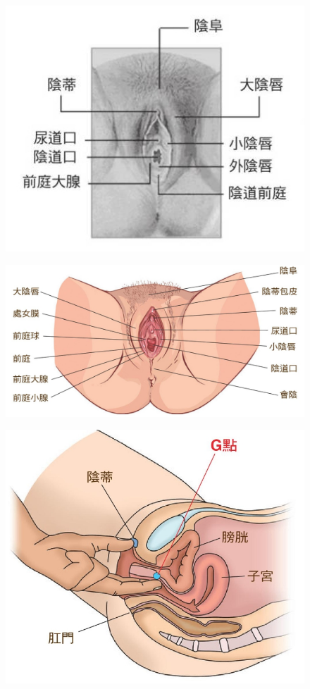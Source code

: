 \documentclass[12pt,UTF8]{ctexbook}
\begin{document}
\begin{figure}[htbp]
	\centering
	\includegraphics[width=0.7\linewidth]{2}
	\caption{}
	\label{fig:1}
\end{figure}

\begin{figure}[htbp]
	\centering
	\includegraphics[width=0.7\linewidth]{7}
	\caption{}
	\label{fig:1}
\end{figure}

\begin{figure}[htbp]
	\centering
	\includegraphics[width=0.7\linewidth]{8}
	\caption{}
	\label{fig:1}
\end{figure}
\end{document}

